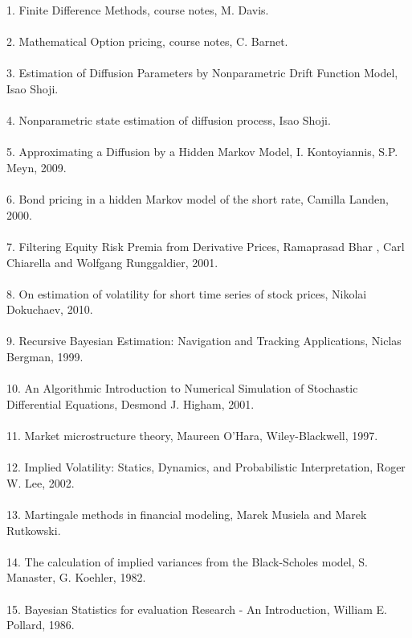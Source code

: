 \documentclass{article}
\theoremstyle{definition}
\theoremstyle{remark}
\begin{document}
1. Finite Difference Methods, course notes, M. Davis.\\
\\
2. Mathematical Option pricing, course notes, C. Barnet. \\
\\
3. Estimation of Diffusion Parameters by Nonparametric Drift Function Model, Isao Shoji. \\
\\
4. Nonparametric state estimation of diffusion process, Isao Shoji.\\
\\
5. Approximating a Diffusion by a Hidden Markov Model, I. Kontoyiannis, S.P. Meyn, 2009.\\
\\
6. Bond pricing in a hidden Markov model of the short rate, Camilla Landen, 2000.\\
\\
7. Filtering Equity Risk Premia from Derivative Prices, Ramaprasad Bhar , Carl Chiarella and Wolfgang Runggaldier, 2001.\\
\\
8. On estimation of volatility for short time series of stock prices, Nikolai Dokuchaev, 2010.\\
\\
9. Recursive Bayesian Estimation: Navigation and Tracking Applications, Niclas Bergman, 1999.\\
\\
10. An Algorithmic Introduction to Numerical Simulation of Stochastic Differential Equations, Desmond J. Higham, 2001.\\
\\
11. Market microstructure theory, Maureen O'Hara, Wiley-Blackwell, 1997.\\
\\
12. Implied Volatility: Statics, Dynamics, and Probabilistic Interpretation, Roger W. Lee, 2002.\\
\\
13. Martingale methods in financial modeling, Marek Musiela and Marek Rutkowski.\\
\\
14. The calculation of implied variances from the Black-Scholes model, S. Manaster, G. Koehler, 1982.\\
\\
15. Bayesian Statistics for evaluation Research - An Introduction, William E. Pollard, 1986.\\
\\
\end{document}
